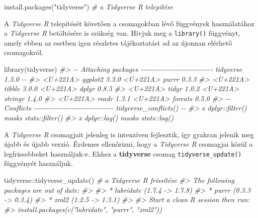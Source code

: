\documentclass[
]{book}
\newenvironment{Shaded}{\begin{snugshade}}{\end{snugshade}}
\newcommand{\CommentTok}[1]{\textcolor[rgb]{0.56,0.35,0.01}{\textit{#1}}}
\newcommand{\FunctionTok}[1]{\textcolor[rgb]{0.00,0.00,0.00}{#1}}
\newcommand{\NormalTok}[1]{#1}
\newcommand{\SpecialCharTok}[1]{\textcolor[rgb]{0.00,0.00,0.00}{#1}}
\newcommand{\StringTok}[1]{\textcolor[rgb]{0.31,0.60,0.02}{#1}}
\begin{document}
\begin{Shaded}
\begin{Highlighting}[]
\FunctionTok{install.packages}\NormalTok{(}\StringTok{"tidyverse"}\NormalTok{) }\CommentTok{\# a Tidyverse R telepítése}
\end{Highlighting}
\end{Shaded}

A \emph{Tidyverse R} telepítését követően a csomagokban lévő függvények használatához a \emph{Tidyverse R} betöltésére is szükség van. Hívjuk meg a \texttt{library()} függvényt, amely ebben az esetben igen részletes tájékoztatást ad az újonnan elérhető csomagokról.

\begin{Shaded}
\begin{Highlighting}[]
\FunctionTok{library}\NormalTok{(tidyverse)}
\CommentTok{\#\textgreater{} {-}{-} Attaching packages {-}{-}{-}{-}{-}{-}{-}{-}{-}{-}{-}{-}{-}{-}{-}{-}{-}{-}{-}{-}{-}{-}{-}{-}{-}{-}{-}{-}{-} tidyverse 1.3.0 {-}{-}}
\CommentTok{\#\textgreater{} \textless{}U+221A\textgreater{} ggplot2 3.3.0     \textless{}U+221A\textgreater{} purrr   0.3.3}
\CommentTok{\#\textgreater{} \textless{}U+221A\textgreater{} tibble  3.0.0     \textless{}U+221A\textgreater{} dplyr   0.8.5}
\CommentTok{\#\textgreater{} \textless{}U+221A\textgreater{} tidyr   1.0.2     \textless{}U+221A\textgreater{} stringr 1.4.0}
\CommentTok{\#\textgreater{} \textless{}U+221A\textgreater{} readr   1.3.1     \textless{}U+221A\textgreater{} forcats 0.5.0}
\CommentTok{\#\textgreater{} {-}{-} Conflicts {-}{-}{-}{-}{-}{-}{-}{-}{-}{-}{-}{-}{-}{-}{-}{-}{-}{-}{-}{-}{-}{-}{-}{-}{-}{-}{-}{-}{-}{-}{-}{-} tidyverse\_conflicts() {-}{-}}
\CommentTok{\#\textgreater{} x dplyr::filter() masks stats::filter()}
\CommentTok{\#\textgreater{} x dplyr::lag()    masks stats::lag()}
\end{Highlighting}
\end{Shaded}

A \emph{Tidyverse R} csomagjait jelenleg is intenzíven fejlesztik, így gyakran jelenik meg újabb és újabb verzió. Érdemes ellenőrizni, hogy a \emph{Tidyverse R} csomagjai közül a legfrissebbeket használjuk-e. Ehhez a \textbf{tidyverse} csomag \texttt{tidyverse\_update()} függvényét használjuk.

\begin{Shaded}
\begin{Highlighting}[]
\NormalTok{tidyverse}\SpecialCharTok{::}\FunctionTok{tidyverse\_update}\NormalTok{()  }\CommentTok{\# a Tidyverse R frissítése}
\CommentTok{\#\textgreater{} The following packages are out of date:}
\CommentTok{\#\textgreater{} }
\CommentTok{\#\textgreater{} * lubridate (1.7.4 {-}\textgreater{} 1.7.8)}
\CommentTok{\#\textgreater{} * purrr     (0.3.3 {-}\textgreater{} 0.3.4)}
\CommentTok{\#\textgreater{} * xml2      (1.2.5 {-}\textgreater{} 1.3.1)}
\CommentTok{\#\textgreater{} }
\CommentTok{\#\textgreater{} Start a clean R session then run:}
\CommentTok{\#\textgreater{} install.packages(c("lubridate", "purrr", "xml2"))}
\end{Highlighting}
\end{Shaded}
\end{document}
